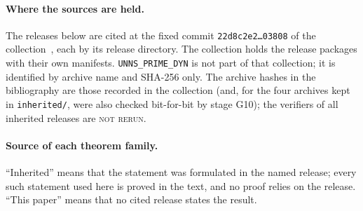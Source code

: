 \paragraph{Where the sources are held.} The releases below are cited at the fixed commit \texttt{22d8c2e2\dots03808} of the collection~\cite{coll}, each by its release directory. The collection holds the release packages with their own manifests. \texttt{UNNS\_PRIME\_DYN} is not part of that collection; it is identified by archive name and SHA-256 only. The archive hashes in the bibliography are those recorded in the collection (and, for the four archives kept in \texttt{inherited/}, were also checked bit-for-bit by stage G10); the verifiers of all inherited releases are \textsc{not rerun}.

\paragraph{Source of each theorem family.} ``Inherited'' means that the statement was formulated in the named release; every such statement used here is proved in the text, and no proof relies on the release. ``This paper'' means that no cited release states the result.
